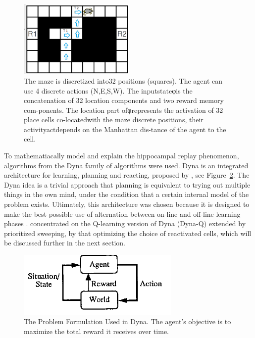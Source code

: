 \documentclass[a4paper]{article}
\begin{document}
		\begin{figure}[t]
			\centering
			\includegraphics[angle=0,width=0.5\textwidth]{./figs/setup.png}
			\caption{\label{fig:setup}The  maze  is  discretized  into32  positions  (squares).  The  agent  can  use  4  discrete  actions  (N,E,S,W).  The  inputstateφis the concatenation of 32 location components and two reward memory com-ponents. The location part ofφrepresents the activation of 32 place cells co-locatedwith  the  maze  discrete  positions,  their  activityactdepends  on  the  Manhattan  dis-tance  of  the  agent  to  the  cell. \citep{NeuralDynaQ}}
		\end{figure}
		
		\par To mathematiacally model and explain the hippocampal replay phenomenon, algorithms from the Dyna family of algorithms were used. Dyna is an integrated architecture for learning, planning and reacting, proposed by \cite{Dyna}, see Figure~\ref{fig:dyna}. The Dyna idea is a trivial approach that planning is equivalent to trying out multiple things in the own mind, under the condition that a certain internal model of the problem exists. Ultimately, this architecture was chosen because it is designed to make the best possible use of alternation between on-line and off-line learning phases \citep{Dyna}. \cite{NeuralDynaQ} concentrated on the Q-learning version of Dyna (Dyna-Q) extended by prioritized sweeping, by that optimizing the choice of reactivated cells, which will be discussed further in the next section.


	\begin{figure}[h]
		\centering
		\includegraphics[angle=0,width=0.7\textwidth]{./figs/Dyna-Figure1.png}
		\caption{\label{fig:dyna}The Problem Formulation Used in Dyna. The agent's objective is to maximize the total reward it receives over time. \citep{Dyna}}
	\end{figure}
\end{document}
